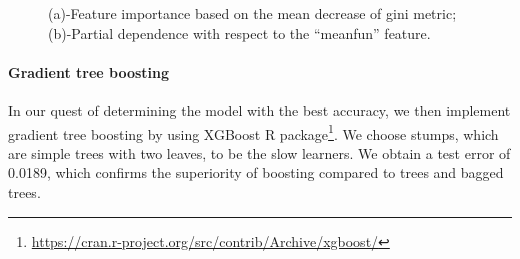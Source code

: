 \begin{figure}[htb]
	\hfill%
	\hfill%
	\hfill\null%
	\caption{(a)-Feature importance based on the mean decrease of gini metric; (b)-Partial dependence with respect to the ``meanfun'' feature.}
	\label{fig_tree_feature}
\end{figure}
\paragraph{Gradient tree boosting}
In our quest of determining the model with the best accuracy, we then implement gradient tree boosting by using XGBoost R package\footnote{\url{https://cran.r-project.org/src/contrib/Archive/xgboost/}}. We choose stumps, which are simple trees with two leaves, to be the slow learners. We obtain a test error of \num{0.0189}, which confirms the superiority of boosting compared to trees and bagged trees.

